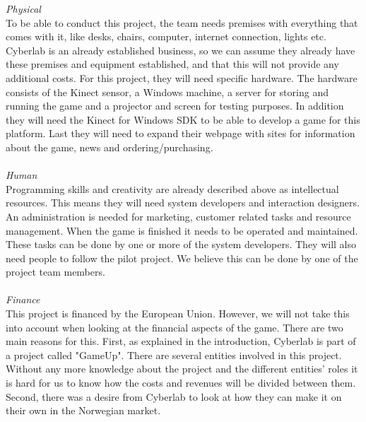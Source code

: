 \emph{Physical} \\ To be able to conduct this project, the team needs premises with everything that comes with it, like desks, chairs, computer, internet connection, lights etc. Cyberlab is an already established business, so we can assume they already have these premises and equipment established, and that this will not provide any additional costs. For this project, they will need specific hardware. The hardware consists of the Kinect sensor, a Windows machine, a server for storing and running the game and a projector and screen for testing purposes. In addition they will need the Kinect for Windows SDK to be able to develop a game for this platform. Last they will need to expand their webpage with sites for information about the game, news and ordering/purchasing. \\ \\
\emph{Human} \\ Programming skills and creativity are already described above as intellectual resources. This means they will need system developers and interaction designers. An administration is needed for marketing, customer related tasks and resource management. When the game is finished it needs to be operated and maintained. These tasks can be done by one or more of the system developers. They will also need people to follow the pilot project. We believe this can be done by one of the project team members. \\ \\
\emph{Finance} \\ This project is financed by the European Union. However, we will not take this into account when looking at the financial aspects of the game. There are two main reasons for this. First, as explained in the introduction, Cyberlab is part of a project called "GameUp". There are several entities involved in this project. Without any more knowledge about the project and the different entities' roles it is hard for us to know how the costs and revenues will be divided between them. Second, there was a desire from Cyberlab to look at how they can make it on their own in the Norwegian market. 

